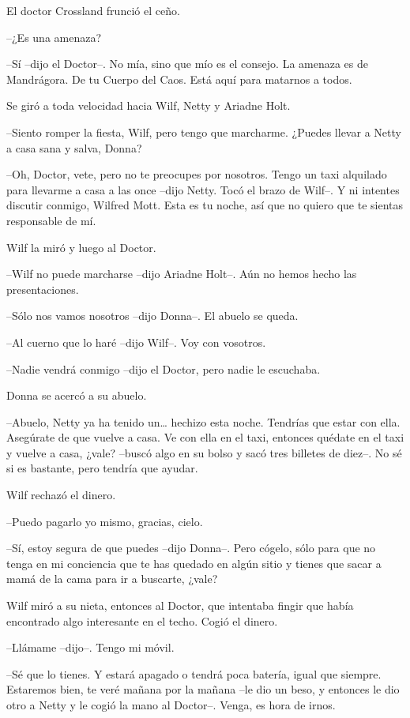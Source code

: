 El doctor Crossland frunció el ceño.

--¿Es una amenaza?

--Sí --dijo el Doctor--. No mía, sino que mío es el consejo. La amenaza
es de Mandrágora. De tu Cuerpo del Caos. Está aquí para matarnos a
todos.

Se giró a toda velocidad hacia Wilf, Netty y Ariadne Holt.

--Siento romper la fiesta, Wilf, pero tengo que marcharme. ¿Puedes
llevar a Netty a casa sana y salva, Donna?

--Oh, Doctor, vete, pero no te preocupes por nosotros. Tengo un taxi
alquilado para llevarme a casa a las once --dijo Netty. Tocó el brazo de
Wilf--. Y ni intentes discutir conmigo, Wilfred Mott. Esta es tu noche,
así que no quiero que te sientas responsable de mí.

Wilf la miró y luego al Doctor.

--Wilf no puede marcharse --dijo Ariadne Holt--. Aún no hemos hecho las
presentaciones.

--Sólo nos vamos nosotros --dijo Donna--. El abuelo se queda.

--Al cuerno que lo haré --dijo Wilf--. Voy con vosotros.

--Nadie vendrá conmigo --dijo el Doctor, pero nadie le escuchaba.

Donna se acercó a su abuelo.

--Abuelo, Netty ya ha tenido un\ldots{} hechizo esta noche. Tendrías que
estar con ella. Asegúrate de que vuelve a casa. Ve con ella en el taxi,
entonces quédate en el taxi y vuelve a casa, ¿vale? --buscó algo en su
bolso y sacó tres billetes de diez--. No sé si es bastante, pero tendría
que ayudar.

Wilf rechazó el dinero.

--Puedo pagarlo yo mismo, gracias, cielo.

--Sí, estoy segura de que puedes --dijo Donna--. Pero cógelo, sólo para
que no tenga en mi conciencia que te has quedado en algún sitio y tienes
que sacar a mamá de la cama para ir a buscarte, ¿vale?

Wilf miró a su nieta, entonces al Doctor, que intentaba fingir que había
encontrado algo interesante en el techo. Cogió el dinero.

--Llámame --dijo--. Tengo mi móvil.

--Sé que lo tienes. Y estará apagado o tendrá poca batería, igual que
siempre. Estaremos bien, te veré mañana por la mañana --le dio un beso,
y entonces le dio otro a Netty y le cogió la mano al Doctor--. Venga, es
hora de irnos.

